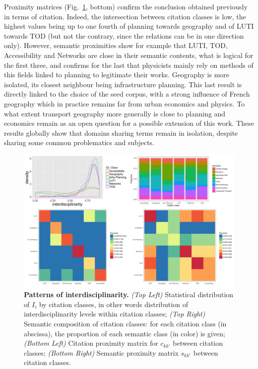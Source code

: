 \documentclass[10pt]{article}
\begin{document}
Proximity matrices (Fig.~\ref{fig:interdisc}, bottom) confirm the conclusion obtained previously in terms of citation. Indeed, the intersection between citation classes is low, the highest values being up to one fourth of planning towards geography and of LUTI towards TOD (but not the contrary, since the relations can be in one direction only). However, semantic proximities show for example that LUTI, TOD, Accessibility and Networks are close in their semantic contents, what is logical for the first three, and confirms for the last that physicists mainly rely on methods of this fields linked to planning to legitimate their works. Geography is more isolated, its closest neighbour being infrastructure planning. This last result is directly linked to the choice of the seed corpus, with a strong influence of French geography which in practice remains far from urban economics and physics. To what extent transport geography more generally is close to planning and economics remain as an open question for a possible extension of this work. These results globally show that domains sharing terms remain in isolation, despite sharing some common problematics and subjects.


\begin{figure}
\includegraphics[width=\linewidth]{figures/2-2-2-fig-quantepistemo-interdisc.jpg}
\caption{\textbf{Patterns of interdisciplinarity.} \textit{(Top Left)} Statistical distribution of $I_i$ by citation classes, in other words distribution of interdisciplinarity levels within citation classes; \textit{(Top Right)} Semantic composition of citation classes: for each citation class (in abscissa), the proportion of each semantic class (in color) is given; \textit{(Bottom Left)} Citation proximity matrix for $c_{kk'}$ between citation classes; \textit{(Bottom Right)} Semantic proximity matrix $s_{kk'}$ between citation classes. \label{fig:interdisc}}
\end{figure}
\end{document}
